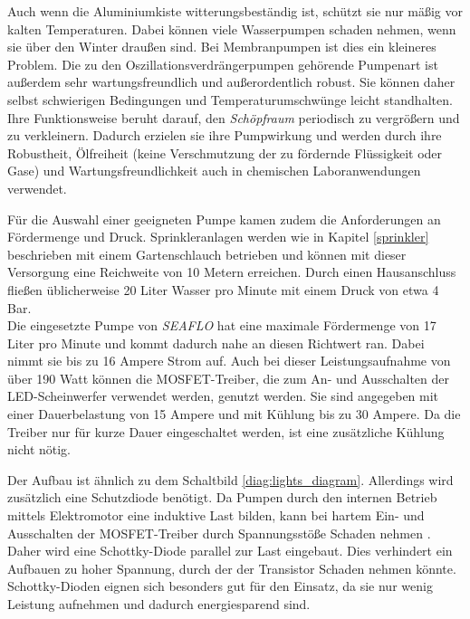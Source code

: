 Auch wenn die Aluminiumkiste witterungsbeständig ist, schützt sie nur mäßig vor kalten Temperaturen. Dabei können viele Wasserpumpen schaden nehmen, wenn sie über den Winter draußen sind. Bei Membranpumpen ist dies ein kleineres Problem. Die zu den Oszillationsverdrängerpumpen gehörende Pumpenart ist außerdem sehr wartungsfreundlich und außerordentlich robust. Sie können daher selbst schwierigen Bedingungen und Temperaturumschwünge leicht standhalten.
\\
Ihre Funktionsweise beruht darauf, den \textit{Schöpfraum} periodisch zu vergrößern und zu verkleinern. Dadurch erzielen sie ihre Pumpwirkung und werden durch ihre Robustheit, Ölfreiheit (keine Verschmutzung der zu fördernde Flüssigkeit oder Gase) und Wartungsfreundlichkeit auch in chemischen Laboranwendungen verwendet. \cite{Jousten2018}

Für die Auswahl einer geeigneten Pumpe kamen zudem die Anforderungen an Fördermenge und Druck. Sprinkleranlagen werden wie in Kapitel \ref{sprinkler} beschrieben mit einem Gartenschlauch betrieben und können mit dieser Versorgung eine Reichweite von 10 Metern erreichen. Durch einen Hausanschluss fließen üblicherweise 20 Liter Wasser pro Minute mit einem Druck von etwa 4 Bar.\\
Die eingesetzte Pumpe von \textit{SEAFLO} hat eine maximale Fördermenge von 17 Liter pro Minute und kommt dadurch nahe an diesen Richtwert ran. Dabei nimmt sie bis zu 16 Ampere Strom auf. Auch bei dieser Leistungsaufnahme von über 190 Watt können die MOSFET-Treiber, die zum An- und Ausschalten der LED-Scheinwerfer verwendet werden, genutzt werden. Sie sind angegeben mit einer Dauerbelastung von 15 Ampere und mit Kühlung bis zu 30 Ampere. Da die Treiber nur für kurze Dauer eingeschaltet werden, ist eine zusätzliche Kühlung nicht nötig. \cite{mosfets_am,seaflo_pump}

Der Aufbau ist ähnlich zu dem Schaltbild \ref{diag:lights_diagram}. Allerdings wird zusätzlich eine Schutzdiode benötigt. Da Pumpen durch den internen Betrieb mittels Elektromotor eine induktive Last bilden, kann bei hartem Ein- und Ausschalten der MOSFET-Treiber durch Spannungsstöße Schaden nehmen \cite{induktive_last_diode}. Daher wird eine Schottky-Diode parallel zur Last eingebaut. Dies verhindert ein Aufbauen zu hoher Spannung, durch der der Transistor Schaden nehmen könnte. Schottky-Dioden eignen sich besonders gut für den Einsatz, da sie nur wenig Leistung aufnehmen und dadurch energiesparend sind. \cite{induktive_last_diode,am_schottky}

